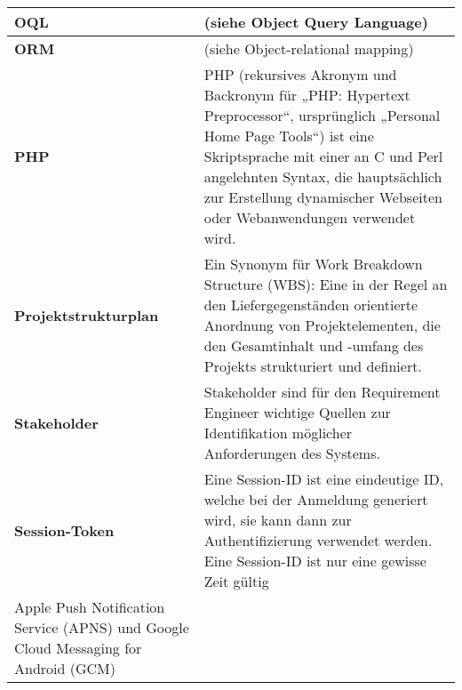 \begin{longtable}{|m{3cm}|m{11cm}|}
	\textbf{OQL}&
	(siehe Object Query Language)\\ \hline

	\textbf{ORM}&
	(siehe Object-relational mapping)\\ \hline

	\textbf{PHP}&
	PHP (rekursives Akronym und Backronym für „PHP: Hypertext Preprocessor“, ursprünglich „Personal Home Page Tools“) ist eine Skriptsprache mit einer an C und Perl angelehnten Syntax, die hauptsächlich zur Erstellung dynamischer Webseiten oder Webanwendungen verwendet wird.\cite{wiki_php}\\ \hline	

	\textbf{Projektstrukturplan}&
	Ein Synonym für Work Breakdown Structure (WBS): Eine in der Regel an den Liefergegenständen orientierte Anordnung von Projektelementen, die den Gesamtinhalt und -umfang des Projekts strukturiert und definiert.\cite{proj_mgmt_book}\\ \hline	

	\textbf{Stakeholder}&
	Stakeholder sind für den Requirement Engineer wichtige Quellen zur Identifikation möglicher Anforderungen des Systems.\cite{req_eng_book}\\ \hline		

	\textbf{Session-Token}&
	Eine Session-ID ist eine eindeutige ID, welche bei der Anmeldung generiert wird, sie kann dann zur Authentifizierung verwendet werden. Eine Session-ID ist nur eine gewisse Zeit gültig \\ \hline		

Apple Push Notification Service (APNS) und Google Cloud Messaging for Android (GCM)	


\end{longtable}
